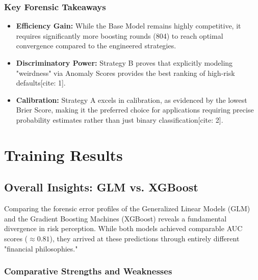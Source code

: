 \documentclass{report}\usepackage[]{graphicx}\usepackage[]{xcolor}
\begin{document}
\subsection{Key Forensic Takeaways}

\begin{itemize}
    \item \textbf{Efficiency Gain:} While the Base Model remains highly competitive, it requires significantly more boosting rounds (804) to reach optimal convergence compared to the engineered strategies.
    \item \textbf{Discriminatory Power:} Strategy B proves that explicitly modeling "weirdness" via Anomaly Scores provides the best ranking of high-risk defaults[cite: 1].
    \item \textbf{Calibration:} Strategy A excels in calibration, as evidenced by the lowest Brier Score, making it the preferred choice for applications requiring precise probability estimates rather than just binary classification[cite: 2].
\end{itemize}


\chapter{Training Results}

\section{Overall Insights: GLM vs. XGBoost}

Comparing the forensic error profiles of the Generalized Linear Models (GLM) and the Gradient Boosting Machines (XGBoost) reveals a fundamental divergence in risk perception. While both models achieved comparable AUC scores ($\approx 0.81$), they arrived at these predictions through entirely different "financial philosophies."

\subsection{Comparative Strengths and Weaknesses}
\end{document}
